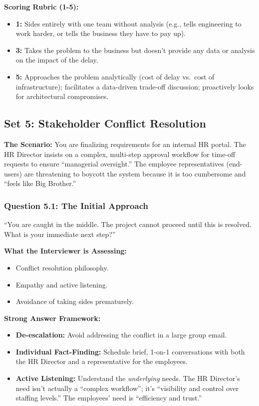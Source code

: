 \documentclass[
  11pt,
  openany,
  oneside]{book}
\providecommand{\tightlist}{%
  \setlength{\itemsep}{0pt}\setlength{\parskip}{0pt}}
\begin{document}
\textbf{Scoring Rubric (1-5):}

\begin{itemize}
\tightlist
\item
  \textbf{1:} Sides entirely with one team without analysis (e.g., tells
  engineering to work harder, or tells the business they have to pay
  up).
\item
  \textbf{3:} Takes the problem to the business but doesn't provide any
  data or analysis on the impact of the delay.
\item
  \textbf{5:} Approaches the problem analytically (cost of delay
  vs.~cost of infrastructure); facilitates a data-driven trade-off
  discussion; proactively looks for architectural compromises.
\end{itemize}

\bigskip

\subsection{Set 5: Stakeholder Conflict
Resolution}\label{set-5-stakeholder-conflict-resolution}

\textbf{The Scenario:} You are finalizing requirements for an internal
HR portal. The HR Director insists on a complex, multi-step approval
workflow for time-off requests to ensure ``managerial oversight.'' The
employee representatives (end-users) are threatening to boycott the
system because it is too cumbersome and ``feels like Big Brother.''

\subsubsection{Question 5.1: The Initial
Approach}\label{question-5.1-the-initial-approach}

``You are caught in the middle. The project cannot proceed until this is
resolved. What is your immediate next step?''

\textbf{What the Interviewer is Assessing:}

\begin{itemize}
\tightlist
\item
  Conflict resolution philosophy.
\item
  Empathy and active listening.
\item
  Avoidance of taking sides prematurely.
\end{itemize}

\textbf{Strong Answer Framework:}

\begin{itemize}
\tightlist
\item
  \textbf{De-escalation:} Avoid addressing the conflict in a large group
  email.
\item
  \textbf{Individual Fact-Finding:} Schedule brief, 1-on-1 conversations
  with both the HR Director and a representative for the employees.
\item
  \textbf{Active Listening:} Understand the \emph{underlying} needs. The
  HR Director's need isn't actually a ``complex workflow''; it's
  ``visibility and control over staffing levels.'' The employees' need
  is ``efficiency and trust.''
\end{itemize}
\end{document}
